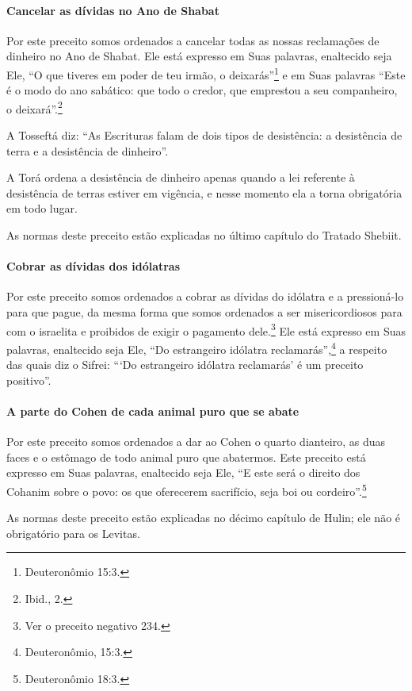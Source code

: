 \paragraph{Cancelar as dívidas no Ano de Shabat}

Por este preceito somos ordenados a cancelar todas as nossas
reclamações de dinheiro no Ano de Shabat. Ele está expresso em Suas
palavras, enaltecido seja Ele, ``O que tiveres em poder de teu irmão, o
deixarás''\footnote{Deuteronômio 15:3.} e em Suas palavras ``Este é o modo do
ano sabático: que todo o credor, que emprestou a seu companheiro, o
deixará''.\footnote{Ibid., 2.}

A Tosseftá diz: ``As Escrituras falam de dois tipos de desistência: a
desistência de terra e a desistência de dinheiro''.

A Torá ordena a desistência de dinheiro apenas quando a lei referente
à desistência de terras estiver em vigência, e nesse momento ela a torna
obrigatória em todo lugar.

As normas deste preceito estão explicadas no último capítulo do Tratado
Shebiit.

\paragraph{Cobrar as dívidas dos idólatras}

Por este preceito somos ordenados a cobrar as dívidas do idólatra e a
pressioná-lo para que pague, da mesma forma que somos ordenados a ser
misericordiosos para com o israelita e proibidos de exigir o pagamento
dele.\footnote{Ver o preceito negativo 234.} Ele está expresso em Suas palavras,
enaltecido seja Ele, ``Do estrangeiro idólatra reclamarás'',\footnote{Deuteronômio, 15:3.} a respeito das quais diz o Sifrei: ```Do
estrangeiro idólatra reclamarás' é um preceito positivo''.

\paragraph{A parte do Cohen de cada animal puro que se abate}

Por este preceito somos ordenados a dar ao Cohen o quarto
dianteiro, as duas faces e o estômago de todo animal puro que
abatermos. Este preceito está expresso em Suas palavras, enaltecido
seja Ele, ``E este será o direito dos Cohanim sobre o povo: os que
oferecerem sacrifício, seja boi ou cordeiro''.\footnote{Deuteronômio 18:3.}

As normas deste preceito estão explicadas no décimo capítulo de Hulin;
ele não é obrigatório para os Levitas.

